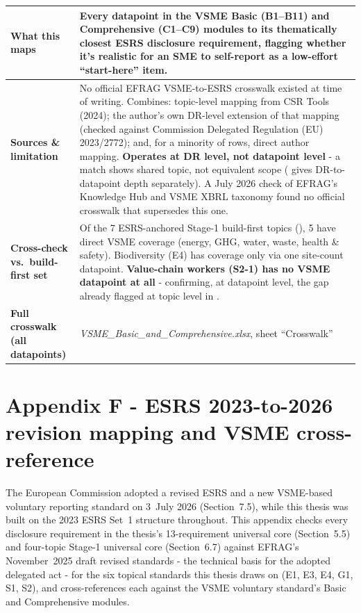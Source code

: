 \documentclass[
]{article}
\begin{document}
\begin{tabularx}{\textwidth}{@{} >{\bfseries}p{3.4cm} X @{}}
\toprule
What this maps & Every datapoint in the VSME Basic (B1--B11) and Comprehensive (C1--C9) modules to its thematically closest ESRS disclosure requirement, flagging whether it's realistic for an SME to self-report as a low-effort ``start-here'' item. \\
\midrule
Sources \& limitation & No official EFRAG VSME-to-ESRS crosswalk existed at time of writing. Combines: topic-level mapping from CSR Tools (2024); the author's own DR-level extension of that mapping (checked against Commission Delegated Regulation (EU) 2023/2772); and, for a minority of rows, direct author mapping. \textbf{Operates at DR level, not datapoint level} - a match shows shared topic, not equivalent scope (\nameref{app:esrs-mapping} gives DR-to-datapoint depth separately). A July 2026 check of EFRAG's Knowledge Hub and VSME XBRL taxonomy found no official crosswalk that supersedes this one. \\
\midrule
Cross-check vs.\ build-first set & Of the 7 ESRS-anchored Stage-1 build-first topics (\nameref{cm-build-first}), 5 have direct VSME coverage (energy, GHG, water, waste, health \& safety). Biodiversity (E4) has coverage only via one site-count datapoint. \textbf{Value-chain workers (S2-1) has no VSME datapoint at all} - confirming, at datapoint level, the gap already flagged at topic level in \nameref{app:esrs-mapping}. \\
\midrule
Full crosswalk (all datapoints) & \emph{VSME\_Basic\_and\_Comprehensive.xlsx}, sheet ``Crosswalk'' \\
\bottomrule
\end{tabularx}

\section*{Appendix F - ESRS 2023-to-2026 revision mapping and VSME cross-reference}\label{app:esrs-mapping}
The European Commission adopted a revised ESRS and a new VSME-based
voluntary reporting standard on 3~July 2026 (Section~7.5), while this thesis
was built on the 2023 ESRS Set~1 structure throughout. This appendix checks
every disclosure requirement in the thesis's 13-requirement universal core
(Section~5.5) and four-topic Stage-1 universal core (Section~6.7)
against EFRAG's November~2025 draft revised standards - the technical
basis for the adopted delegated act - for the six topical standards this
thesis draws on (E1, E3, E4, G1, S1, S2), and cross-references each against
the VSME voluntary standard's Basic and Comprehensive modules.
\end{document}
